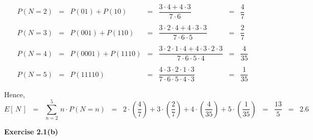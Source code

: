 \begin{equation*}
\begin{array}{ccccccc}
P(N = 2) & = & P(01) + P(10)
         & = & \dfrac{3 \cdot 4 + 4 \cdot 3}{7\cdot 6}
         & = & \dfrac{4}{7}
\\ \\
P(N = 3) & = & P(001) + P(110)
         & = & \dfrac{3 \cdot 2 \cdot 4 + 4 \cdot 3 \cdot 3}{7\cdot 6 \cdot 5}
         & = & \dfrac{2}{7}
\\ \\
P(N = 4) & = & P(0001) + P(1110)
         & = & \dfrac{3 \cdot 2 \cdot 1 \cdot 4 + 4 \cdot 3 \cdot 2 \cdot 3}{7\cdot 6 \cdot 5 \cdot 4}
         & = & \dfrac{4}{35}
\\ \\
P(N = 5) & = & P(11110)
         & = & \dfrac{4 \cdot 3 \cdot 2 \cdot 1 \cdot 3}{7\cdot 6 \cdot 5 \cdot 4 \cdot 3}
         & = & \dfrac{1}{35}
\\ \\
\end{array}
\end{equation*}
Hence,
\begin{equation*}
E\left[\,N\,\right]
\;\;=\;\;   \sum_{n=2}^{5} \, n \cdot P(N = n)
\;\;=\;\;   2\cdot\left(\dfrac{4}{7}\right) + 3\cdot\left(\dfrac{2}{7}\right)
          + 4\cdot\left(\dfrac{4}{35}\right) + 5\cdot\left(\dfrac{1}{35}\right)
\;\;=\;\;   \dfrac{13}{5} \;\; = \;\; 2.6
\end{equation*}

\newpage
\noindent
\textbf{Exercise 2.1(b)}

